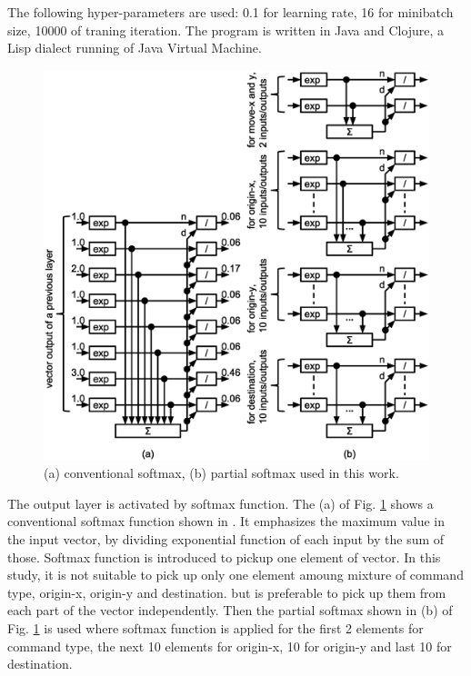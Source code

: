 \documentclass[twocolumn]{article}
\begin{document}
The following hyper-parameters are used:
0.1 for learning rate, 16 for minibatch size, 10000 of traning iteration.
The program is written in Java and Clojure,
a Lisp dialect running of Java Virtual Machine.

\begin{figure}[!tp]
 \begin{center}
  \begin{minipage}{\hsize}
   \includegraphics[width=\hsize]{fig/partial_softmax_05.eps}
   \caption{(a) conventional softmax, (b) partial softmax used in this work.}
   \label{fig:partial_softmax}
  \end{minipage}
 \end{center}
\end{figure}

The output layer is activated by softmax function.
The (a) of Fig. \ref{fig:partial_softmax} shows a conventional softmax
function shown in \cite{mit}.
It emphasizes the maximum value in the input vector,
by dividing exponential function of each input by the sum of those.
Softmax function is introduced to pickup one element of vector.
In this study, it is not suitable to pick up only one element
amoung mixture of command type, origin-x, origin-y and destination.
but is preferable to pick up them from each part of the vector independently.
Then the partial softmax shown in (b) of Fig. \ref{fig:partial_softmax}
is used where softmax function is applied
for the first 2 elements for command type,
the next 10 elements for origin-x, 10 for origin-y and last 10 for destination.
\end{document}
